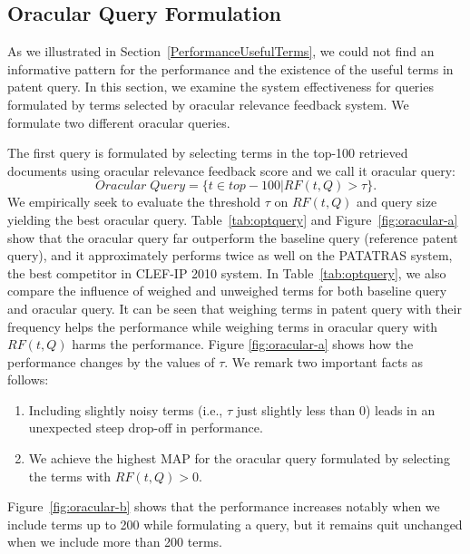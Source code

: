 \subsection{Oracular Query Formulation}
\label{sec:OracularQueryFormulation}
As we illustrated in Section~\ref{PerformanceUsefulTerms}, we could not find an informative pattern for the performance and the existence of the useful terms in patent query.
In this section, we examine the system effectiveness for queries formulated by terms selected by oracular relevance feedback system.
We formulate two different oracular queries.

The first query is formulated by selecting terms in the top-100 retrieved documents using oracular relevance feedback score and we call it oracular query:
\begin{equation}
Oracular \; Query = \{t \in top-100|RF(t, Q)>\tau\}.   
 \label{eq:score}
\end{equation}
We empirically seek to evaluate the threshold $\tau$ on $RF(t,Q)$ and query size yielding the best oracular query.
Table~\ref{tab:optquery} and Figure~\ref{fig:oracular-a} show that the oracular query far outperform the baseline query (reference patent query), and it approximately performs twice as well on the PATATRAS system, the best competitor in CLEF-IP 2010 system. In Table~\ref{tab:optquery}, we also compare the influence of weighed and unweighed terms for both baseline query and oracular query. It can be seen that weighing terms in patent query with their frequency helps the performance while weighing terms in oracular query with $RF(t, Q)$ harms the performance. 
Figure \ref{fig:oracular-a} shows how the performance changes by the values of $\tau$. We remark two important facts as follows: 
\begin{enumerate}
\item Including slightly noisy terms (i.e., $\tau$ just slightly less than 0) leads in an unexpected steep drop-off in performance.  
\item We achieve the highest MAP for the oracular query formulated by selecting the terms with $RF(t, Q)>0$.
\end{enumerate}
Figure~\ref{fig:oracular-b} shows that the performance increases notably when we include terms up to 200 while formulating a query, but it remains quit unchanged when we include more than 200 terms. 
